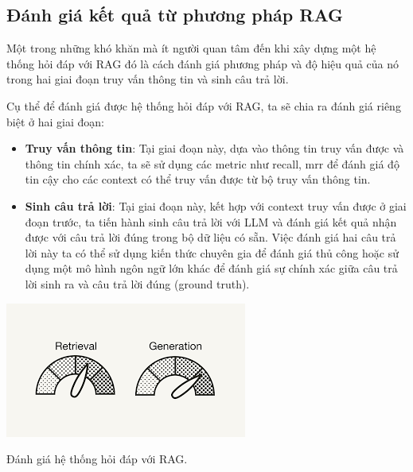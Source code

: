 \documentclass[a4paper, 12pt, openany]{book}
\begin{document}
\subsection{Đánh giá kết quả từ phương pháp RAG}

Một trong những khó khăn mà ít người quan tâm đến khi xây dựng một hệ thống hỏi đáp với RAG đó là cách đánh giá phương pháp và độ hiệu quả của nó trong
hai giai đoạn truy vấn thông tin và sinh câu trả lời.

Cụ thể để đánh giá được hệ thống hỏi đáp với RAG, ta sẽ chia ra đánh giá riêng biệt ở hai giai đoạn:

\begin{itemize}
    \item \textbf{Truy vấn thông tin}: Tại giai đoạn này, dựa vào thông tin truy vấn được và thông tin chính xác, ta sẽ sử dụng các metric như
    recall, \ac{mrr} để đánh giá độ tin cậy cho các context có thể truy vấn được từ bộ truy vấn thông tin.
    \item \textbf{Sinh câu trả lời}: Tại giai đoạn này, kết hợp với context truy vấn được ở giai đoạn trước, ta tiến hành sinh câu trả lời với LLM và đánh giá kết quả nhận được với câu trả lời đúng trong bộ dữ liệu có sẵn.
    Việc đánh giá hai câu trả lời này ta có thể sử dụng kiến thức chuyên gia để đánh giá thủ công hoặc sử dụng một mô hình ngôn ngữ lớn khác để đánh giá sự chính xác giữa câu trả lời sinh ra và câu trả lời đúng (ground truth).
\end{itemize}

\vspace{0.5cm}
\begin{minipage}{\linewidth}
    \centering
    \includegraphics[width=.9\linewidth]{./assets/images/rag-eval.png}
    \captionsetup{type=figure}
    \caption{Đánh giá hệ thống hỏi đáp với RAG.}
\end{minipage}
\vspace{0.5cm}
\end{document}
